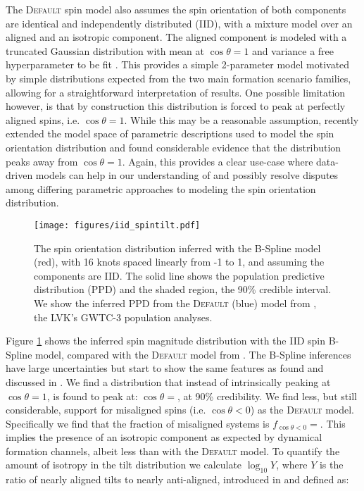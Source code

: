 The \textsc{Default} spin model also assumes the spin orientation of both components are identical and independently distributed (IID), with a mixture model over an
aligned and an isotropic component. The aligned component is modeled with a truncated Gaussian distribution with mean at $\cos{\theta}=1$ and variance a free 
hyperparameter to be fit \citep{Talbot_2017,Wysocki_2019,o3a_pop,o3b_astro_dist}. This provides a simple 2-parameter model motivated by simple distributions expected from the two main formation scenario families, allowing 
for a straightforward interpretation of results. One possible limitation however, is that by construction this distribution is forced to peak at perfectly aligned spins, 
i.e. $\cos{\theta}=1$. While this may be a reasonable assumption, \citet{spinitasyoulike} recently extended the model space of parametric descriptions 
used to model the spin orientation distribution and found considerable evidence that the distribution peaks away from $\cos{\theta}=1$. Again, this provides a clear 
use-case where data-driven models can help in our understanding of and possibly resolve disputes among differing parametric approaches to modeling the spin orientation distribution.

\begin{figure}
    \begin{centering}
        \texttt{[image: figures/iid\_spintilt.pdf]}
        \caption{The spin orientation distribution inferred with the B-Spline model (red), with 16 knots spaced linearly from -1 to 1, and 
        assuming the components are IID. The solid line shows the population predictive distribution (PPD) and the shaded region, the 90\% credible interval. 
        We show the inferred PPD from the \textsc{Default} (blue) model from \citet{o3b_astro_dist}, the LVK's GWTC-3 population analyses.}
        \label{fig:iid_spintilt_dist}
    \end{centering}
\end{figure}

Figure \ref{fig:iid_spintilt_dist} shows the inferred spin magnitude distribution with the IID spin B-Spline model, compared with the \textsc{Default} model from \citet{o3b_astro_dist}. 
The B-Spline inferences have large uncertainties but start to show the same features as found and discussed in \citet{spinitasyoulike}. 
We find a distribution that instead of intrinsically peaking at $\cos{\theta}=1$, is found to peak at: $\cos{\theta}=$\result{$\CIPlusMinus{\macros[BSplineIIDCompSpins][peakCosTilt]}$}, at 
90\% credibility. We find less, but still considerable, support for misaligned spins (i.e. $\cos{\theta}<0$) as the \textsc{Default} model. Specifically we 
find that the fraction of misaligned systems is $f_{\cos{\theta}<0}=$\result{$\CIPlusMinus{\macros[BSplineIIDCompSpins][negFrac]}$}. This implies 
the presence of an isotropic component as expected by dynamical formation channels, albeit less than with the \textsc{Default} model. To quantify the 
amount of isotropy in the tilt distribution we calculate $\log_{10}Y$, where $Y$ is the ratio of nearly aligned tilts to nearly anti-aligned, 
introduced in \citet{spinitasyoulike} and defined as:

